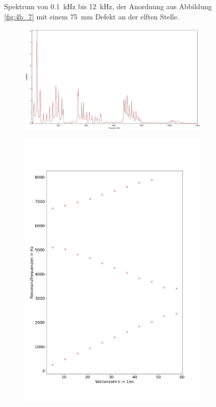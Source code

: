 \begin{figure}
\begin{subfigure}{0.34\textwidth}
\end{subfigure}
\caption{Spektrum von 0.1~kHz bis 12~kHz, der Anordnung aus Abbildung \ref{fig:4b_7} mit einem 75~mm Defekt an der elften Stelle.}
\label{fig:4b_7_1b}
\end{figure}
\begin{figure}
\centering
\begin{subfigure}{0.65\textwidth}
\includegraphics[width=\textwidth]{content/messungen/Chapter4b/4b_7_1c.jpg}
\end{subfigure}
\begin{subfigure}{0.34\textwidth}
\includegraphics[width=\textwidth]{content/Scripts/4b_7_1c.jpg}

\end{subfigure}
\end{figure}
